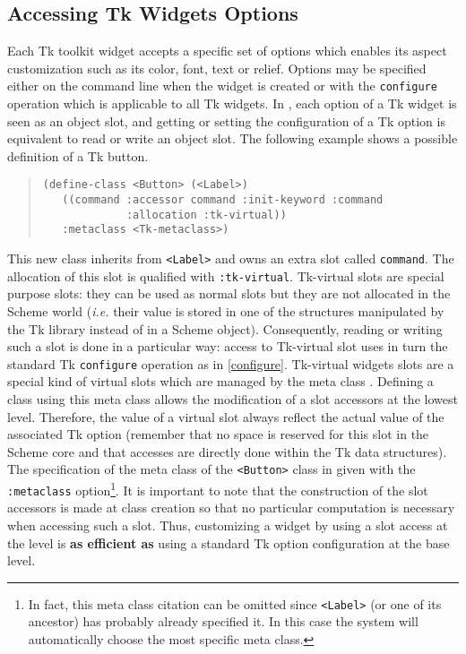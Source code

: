 {\subsection{Accessing Tk Widgets Options}

Each Tk toolkit widget accepts a specific set of options which enables its
aspect customization such as its color, font, text or relief. Options may
be specified either on the command line when the widget is created or with
the {\tt configure} operation which is applicable to all Tk widgets. In
{\stklos}, each option of a Tk widget is seen as an object slot, and
getting or setting the configuration of a Tk option is equivalent to read
or write an object slot. The following example shows a possible {\stklos}
definition of a Tk button.

\begin{quote}\figsize
\begin{minipage}{12cm}
\begin{verbatim}
(define-class <Button> (<Label>)
   ((command :accessor command :init-keyword :command 
             :allocation :tk-virtual))
   :metaclass <Tk-metaclass>)
\end{verbatim}
\end{minipage}
\end{quote}
This new class inherits from {\tt <Label>} and owns an extra slot
called {\tt command}.  The allocation of this slot is qualified with
{\tt :tk-virtual}. \label{tk-virtual}Tk-virtual slots are special
purpose slots: they can be used as normal slots but they are not
allocated in the Scheme world ({\em i.e.} their value is stored in one
of the structures manipulated by the Tk library instead of in a Scheme
object). Consequently, reading or writing such a slot is done in a
particular way: access to Tk-virtual slot uses in turn the standard Tk
{\tt configure} operation as in \ref{configure}. Tk-virtual widgets
slots are a special kind of virtual slots which are managed by the
meta class {\tt <Tk-metaclass>}. Defining a class using this meta
class allows the modification of a slot accessors at the lowest
level. Therefore, the value of a virtual slot always reflect the
actual value of the associated Tk option (remember that no space is
reserved for this slot in the Scheme core and that accesses are
directly done within the Tk data structures). The specification of the
meta class of the {\tt <Button>} class in given with the {\tt
:metaclass} option\footnote{In fact, this meta class citation can be
omitted since {\tt <Label>} (or one of its ancestor) has probably
already specified it. In this case the system will automatically
choose the most specific meta class.}.  It is important to note that
the construction of the slot accessors is made at class creation so
that no particular computation is necessary when accessing such a
slot. Thus, customizing a widget by using a slot access at the
{\stklos} level is {\bf as efficient as} using a standard Tk option
configuration at the {\stk} base level.

}
